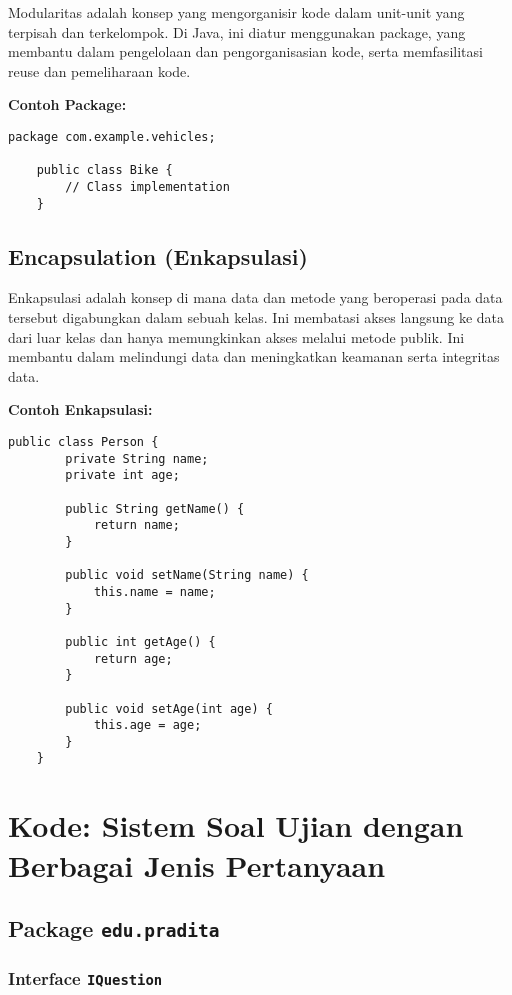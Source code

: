 Modularitas adalah konsep yang mengorganisir kode dalam unit-unit yang terpisah dan terkelompok. Di Java, ini diatur menggunakan package, yang membantu dalam pengelolaan dan pengorganisasian kode, serta memfasilitasi reuse dan pemeliharaan kode.

\textbf{Contoh Package:}

\begin{lstlisting}[style=JavaStyle]
	package com.example.vehicles;
	
	public class Bike {
		// Class implementation
	}
\end{lstlisting}

\subsection{Encapsulation (Enkapsulasi)}

Enkapsulasi adalah konsep di mana data dan metode yang beroperasi pada data tersebut digabungkan dalam sebuah kelas. Ini membatasi akses langsung ke data dari luar kelas dan hanya memungkinkan akses melalui metode publik. Ini membantu dalam melindungi data dan meningkatkan keamanan serta integritas data.

\textbf{Contoh Enkapsulasi:}

\begin{lstlisting}[style=JavaStyle]
	public class Person {
		private String name;
		private int age;
		
		public String getName() {
			return name;
		}
		
		public void setName(String name) {
			this.name = name;
		}
		
		public int getAge() {
			return age;
		}
		
		public void setAge(int age) {
			this.age = age;
		}
	}
\end{lstlisting}

\section{Kode: Sistem Soal Ujian dengan Berbagai Jenis Pertanyaan}

\subsection{Package \texttt{edu.pradita}}

\subsubsection{Interface \texttt{IQuestion}}

